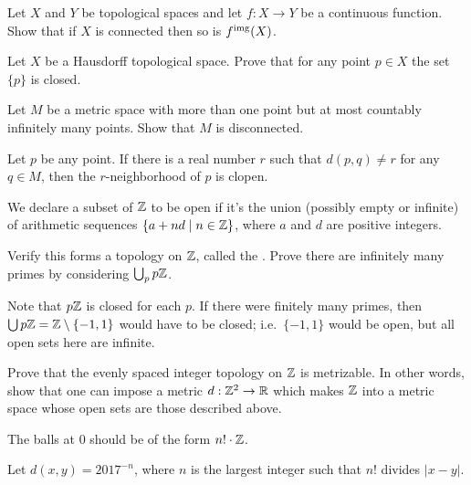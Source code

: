 \begin{sproblem}
	Let $X$ and $Y$ be topological spaces
	and let $f \colon X \to Y$ be a continuous function.
	Show that if $X$ is connected then so is $f^{\text{img}}(X)$.
\end{sproblem}

\begin{problem}
	Let $X$ be a Hausdorff topological space.
	Prove that for any point $p \in X$
	the set $\{p\}$ is closed.
\end{problem}

\begin{problem}
	Let $M$ be a metric space with more than one point
	but at most countably infinitely many points.
	Show that $M$ is disconnected.
	\begin{hint}
		Let $p$ be any point.
		If there is a real number $r$
		such that $d(p,q) \ne r$ for any $q \in M$,
		then the $r$-neighborhood of $p$ is clopen.
	\end{hint}
\end{problem}

\begin{problem}[Furstenberg]
	We declare a subset of $\mathbb Z$ to be open
	if it's the union (possibly empty or infinite)
	of arithmetic sequences $\left\{ a + nd \mid n \in \mathbb Z \right\}$,
	where $a$ and $d$ are positive integers.
	\begin{enumerate}[(a)]
		\ii Verify this forms a topology on $\mathbb Z$,
		called the .
		\ii Prove there are infinitely many primes by considering $\bigcup_p p\mathbb Z$.
	\end{enumerate}
	\begin{hint}
		Note that $p\mathbb Z$ is closed for each $p$.
		If there were finitely many primes, then
		$\bigcup p\mathbb Z = \mathbb Z \setminus \{-1,1\}$ would have to be closed;
		i.e.\ $\{-1,1\}$ would be open, but all open sets here are infinite.
	\end{hint}
\end{problem}

\begin{problem}
	\gim
	Prove that the evenly spaced integer topology on $\mathbb Z$ is metrizable.
	In other words, show that one can impose a metric $d : \mathbb Z^2 \to \mathbb R$
	which makes $\mathbb Z$ into a metric space whose open sets are those described above.
	\begin{hint}
		The balls at $0$ should be of the form $n! \cdot \mathbb Z$.
	\end{hint}
	\begin{sol}
		Let $d(x,y) = 2017^{-n}$,
		where $n$ is the largest integer
		such that $n!$ divides $\left\lvert x-y \right\rvert$.
	\end{sol}
\end{problem}

